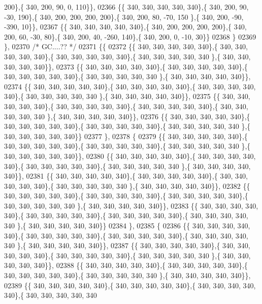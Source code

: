 \begin{DoxyCode}
      200\},\{ 340, 200,  90,   0, 110\}\},
02366 \{\{ 340, 340, 340, 340, 340\},\{ 340, 200,  90, -30, 190\},\{ 340, 200, 200, 200, 200\},\{ 340, 200,  80, -70, 150
      \},\{ 340, 200, -90, -390,  10\}\},
02367 \{\{ 340, 340, 340, 340, 340\},\{ 340, 200, 200, 200, 200\},\{ 340, 200,  60, -30,  80\},\{ 340, 200,  40, -260, 
      140\},\{ 340, 200,   0, -10,  30\}\}
02368 \}
02369 \},
02370 \textcolor{comment}{/* GC....?? */}
02371 \{\{
02372 \{\{ 340, 340, 340, 340, 340\},\{ 340, 340, 340, 340, 340\},\{ 340, 340, 340, 340, 340\},\{ 340, 340, 340, 340, 340
      \},\{ 340, 340, 340, 340, 340\}\},
02373 \{\{ 340, 340, 340, 340, 340\},\{ 340, 340, 340, 340, 340\},\{ 340, 340, 340, 340, 340\},\{ 340, 340, 340, 340, 340
      \},\{ 340, 340, 340, 340, 340\}\},
02374 \{\{ 340, 340, 340, 340, 340\},\{ 340, 340, 340, 340, 340\},\{ 340, 340, 340, 340, 340\},\{ 340, 340, 340, 340, 340
      \},\{ 340, 340, 340, 340, 340\}\},
02375 \{\{ 340, 340, 340, 340, 340\},\{ 340, 340, 340, 340, 340\},\{ 340, 340, 340, 340, 340\},\{ 340, 340, 340, 340, 340
      \},\{ 340, 340, 340, 340, 340\}\},
02376 \{\{ 340, 340, 340, 340, 340\},\{ 340, 340, 340, 340, 340\},\{ 340, 340, 340, 340, 340\},\{ 340, 340, 340, 340, 340
      \},\{ 340, 340, 340, 340, 340\}\}
02377 \},
02378 \{
02379 \{\{ 340, 340, 340, 340, 340\},\{ 340, 340, 340, 340, 340\},\{ 340, 340, 340, 340, 340\},\{ 340, 340, 340, 340, 340
      \},\{ 340, 340, 340, 340, 340\}\},
02380 \{\{ 340, 340, 340, 340, 340\},\{ 340, 340, 340, 340, 340\},\{ 340, 340, 340, 340, 340\},\{ 340, 340, 340, 340, 340
      \},\{ 340, 340, 340, 340, 340\}\},
02381 \{\{ 340, 340, 340, 340, 340\},\{ 340, 340, 340, 340, 340\},\{ 340, 340, 340, 340, 340\},\{ 340, 340, 340, 340, 340
      \},\{ 340, 340, 340, 340, 340\}\},
02382 \{\{ 340, 340, 340, 340, 340\},\{ 340, 340, 340, 340, 340\},\{ 340, 340, 340, 340, 340\},\{ 340, 340, 340, 340, 340
      \},\{ 340, 340, 340, 340, 340\}\},
02383 \{\{ 340, 340, 340, 340, 340\},\{ 340, 340, 340, 340, 340\},\{ 340, 340, 340, 340, 340\},\{ 340, 340, 340, 340, 340
      \},\{ 340, 340, 340, 340, 340\}\}
02384 \},
02385 \{
02386 \{\{ 340, 340, 340, 340, 340\},\{ 340, 340, 340, 340, 340\},\{ 340, 340, 340, 340, 340\},\{ 340, 340, 340, 340, 340
      \},\{ 340, 340, 340, 340, 340\}\},
02387 \{\{ 340, 340, 340, 340, 340\},\{ 340, 340, 340, 340, 340\},\{ 340, 340, 340, 340, 340\},\{ 340, 340, 340, 340, 340
      \},\{ 340, 340, 340, 340, 340\}\},
02388 \{\{ 340, 340, 340, 340, 340\},\{ 340, 340, 340, 340, 340\},\{ 340, 340, 340, 340, 340\},\{ 340, 340, 340, 340, 340
      \},\{ 340, 340, 340, 340, 340\}\},
02389 \{\{ 340, 340, 340, 340, 340\},\{ 340, 340, 340, 340, 340\},\{ 340, 340, 340, 340, 340\},\{ 340, 340, 340, 340, 340

\end{DoxyCode}
